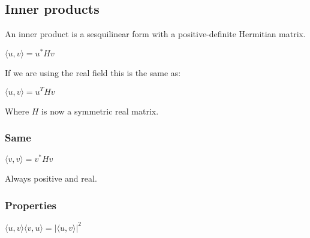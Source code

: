 
\subsection{Inner products}

An inner product is a sesquilinear form with a positive-definite Hermitian matrix.

\( \langle u, v \rangle =u^*Hv\)

If we are using the real field this is the same as:

\( \langle u, v \rangle =u^THv\)

Where \(H\) is now a symmetric real matrix.

\subsubsection{Same}

\( \langle v, v \rangle =v^*Hv\)

Always positive and real.
\subsubsection{Properties}

\(\langle u, v\rangle \langle v, u\rangle=|\langle u, v\rangle|^2\)


